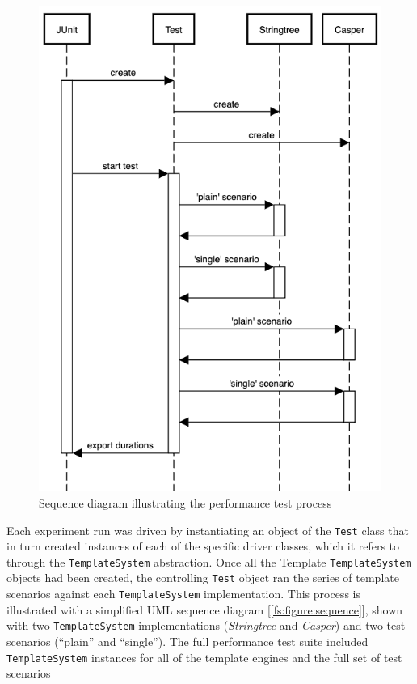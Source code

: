 \begin{figure}[ht!]
\centering
\includegraphics[scale=0.5]{Figures/testsequence.png}
\caption{Sequence diagram illustrating the performance test process}
\label{fs:figure:sequence}
\end{figure}

Each experiment run was driven by instantiating an object of the \texttt{Test} class that in turn created instances of each of the specific driver classes, which it refers to through the \texttt{TemplateSystem} abstraction. Once all the Template \texttt{TemplateSystem} objects had been created, the controlling \texttt{Test} object ran the series of template scenarios against each \texttt{TemplateSystem} implementation. This process is illustrated with a simplified UML sequence diagram [\autoref{fs:figure:sequence}], shown with two \texttt{TemplateSystem} implementations (\emph{Stringtree} and \emph{Casper}) and two test scenarios (\enquote{plain} and \enquote{single}). The full performance test suite included \texttt{TemplateSystem} instances for all of the template engines and the full set of test scenarios

